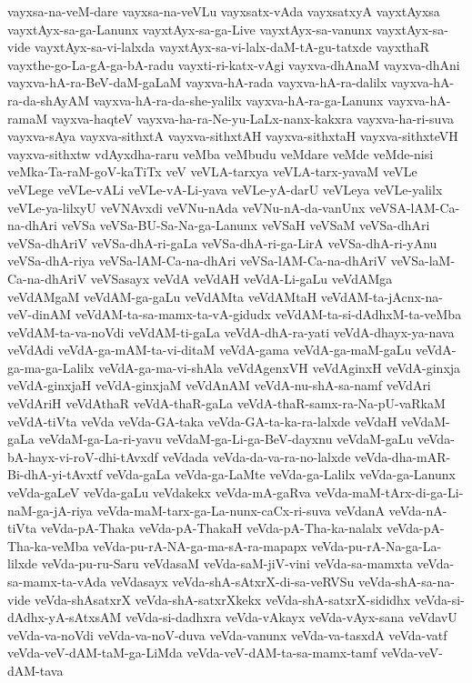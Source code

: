 {vayxsa-na-veM-dare
vayxsa-na-veVLu
vayxsatx-vAda
vayxsatxyA
vayxtAyxsa
vayxtAyx-sa-ga-Lanunx
vayxtAyx-sa-ga-Live
vayxtAyx-sa-vanunx
vayxtAyx-sa-vide
vayxtAyx-sa-vi-lalxda
vayxtAyx-sa-vi-lalx-daM-tA-gu-tatxde
vayxthaR
vayxthe-go-La-gA-ga-bA-radu
vayxti-ri-katx-vAgi
vayxva-dhAnaM
vayxva-dhAni
vayxva-hA-ra-BeV-daM-gaLaM
vayxva-hA-rada
vayxva-hA-ra-dalilx
vayxva-hA-ra-da-shAyAM
vayxva-hA-ra-da-she-yalilx
vayxva-hA-ra-ga-Lanunx
vayxva-hA-ramaM
vayxva-haqteV
vayxva-ha-ra-Ne-yu-LaLx-nanx-kakxra
vayxva-ha-ri-suva
vayxva-sAya
vayxva-sithxtA
vayxva-sithxtAH
vayxva-sithxtaH
vayxva-sithxteVH
vayxva-sithxtw
vdAyxdha-raru
veMba
veMbudu
veMdare
veMde
veMde-nisi
veMka-Ta-raM-goV-kaTiTx
veV
veVLA-tarxya
veVLA-tarx-yavaM
veVLe
veVLege
veVLe-vALi
veVLe-vA-Li-yava
veVLe-yA-darU
veVLeya
veVLe-yalilx
veVLe-ya-lilxyU
veVNAvxdi
veVNu-nAda
veVNu-nA-da-vanUnx
veVSA-lAM-Ca-na-dhAri
veVSa
veVSa-BU-Sa-Na-ga-Lanunx
veVSaH
veVSaM
veVSa-dhAri
veVSa-dhAriV
veVSa-dhA-ri-gaLa
veVSa-dhA-ri-ga-LirA
veVSa-dhA-ri-yAnu
veVSa-dhA-riya
veVSa-lAM-Ca-na-dhAri
veVSa-lAM-Ca-na-dhAriV
veVSa-laM-Ca-na-dhAriV
veVSasayx
veVdA
veVdAH
veVdA-Li-gaLu
veVdAMga
veVdAMgaM
veVdAM-ga-gaLu
veVdAMta
veVdAMtaH
veVdAM-ta-jAcnx-na-veV-dinAM
veVdAM-ta-sa-mamx-ta-vA-gidudx
veVdAM-ta-si-dAdhxM-ta-veMba
veVdAM-ta-va-noVdi
veVdAM-ti-gaLa
veVdA-dhA-ra-yati
veVdA-dhayx-ya-nava
veVdAdi
veVdA-ga-mAM-ta-vi-ditaM
veVdA-gama
veVdA-ga-maM-gaLu
veVdA-ga-ma-ga-Lalilx
veVdA-ga-ma-vi-shAla
veVdAgenxVH
veVdAginxH
veVdA-ginxja
veVdA-ginxjaH
veVdA-ginxjaM
veVdAnAM
veVdA-nu-shA-sa-namf
veVdAri
veVdAriH
veVdAthaR
veVdA-thaR-gaLa
veVdA-thaR-samx-ra-Na-pU-vaRkaM
veVdA-tiVta
veVda
veVda-GA-taka
veVda-GA-ta-ka-ra-lalxde
veVdaH
veVdaM-gaLa
veVdaM-ga-La-ri-yavu
veVdaM-ga-Li-ga-BeV-dayxnu
veVdaM-gaLu
veVda-bA-hayx-vi-roV-dhi-tAvxdf
veVdada
veVda-da-va-ra-no-lalxde
veVda-dha-mAR-Bi-dhA-yi-tAvxtf
veVda-gaLa
veVda-ga-LaMte
veVda-ga-Lalilx
veVda-ga-Lanunx
veVda-gaLeV
veVda-gaLu
veVdakekx
veVda-mA-gaRva
veVda-maM-tArx-di-ga-Li-naM-ga-jA-riya
veVda-maM-tarx-ga-La-nunx-caCx-ri-suva
veVdanA
veVda-nA-tiVta
veVda-pA-Thaka
veVda-pA-ThakaH
veVda-pA-Tha-ka-nalalx
veVda-pA-Tha-ka-veMba
veVda-pu-rA-NA-ga-ma-sA-ra-mapapx
veVda-pu-rA-Na-ga-La-lilxde
veVda-pu-ru-Saru
veVdasaM
veVda-saM-jiV-vini
veVda-sa-mamxta
veVda-sa-mamx-ta-vAda
veVdasayx
veVda-shA-sAtxrX-di-sa-veRVSu
veVda-shA-sa-na-vide
veVda-shAsatxrX
veVda-shA-satxrXkekx
veVda-shA-satxrX-sididhx
veVda-si-dAdhx-yA-sAtxsAM
veVda-si-dadhxra
veVda-vAkayx
veVda-vAyx-sana
veVdavU
veVda-va-noVdi
veVda-va-noV-duva
veVda-vanunx
veVda-va-tasxdA
veVda-vatf
veVda-veV-dAM-taM-ga-LiMda
veVda-veV-dAM-ta-sa-mamx-tamf
veVda-veV-dAM-tava
}
